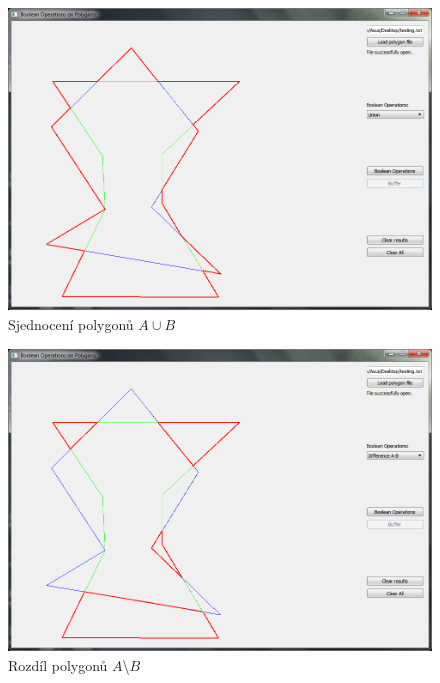 \documentclass[a4paper, 12pt]{article}
\begin{document}
\begin{figure}[h!]
	\centering
	\includegraphics[width=14.5cm]{./pictures/app_union.png}
	\caption{Sjednocení polygonů $A \cup B$}
\end{figure}

\begin{figure}[h!]
	\centering
	\includegraphics[width=14.5cm]{./pictures/app_diffAB.png}
	\caption{Rozdíl polygonů $A$\textbackslash$B$}
\end{figure}
\clearpage
\end{document}
